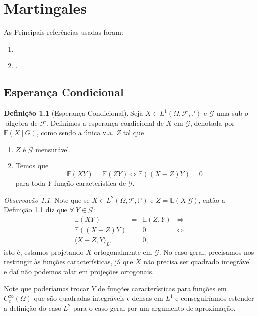 \documentclass[12pt,a4paper,oneside]{book}
\theoremstyle{definition}
\newtheorem{definition}[theorem]{Defini\c{c}\~ao}
\theoremstyle{remark}
\newtheorem{remark}[theorem]{Observa\c{c}\~ao}
\numberwithin{equation}{section}
\newcommand{\E}{\mathbb{E}}
\newcommand{\pr}{\mathbb{P}}
\begin{document}
\newpage








\chapter{Martingales}\label{cap-marting}

\begin{tcolorbox}[colback = white]
As Principais referências usadas foram:
\begin{enumerate}
\item \cite{durrett}
\item \cite{williams-martingales}.
\end{enumerate}
\end{tcolorbox}

\section{Esperança Condicional}



\begin{definition}[Esperança Condicional] \label{defi-espcond}Seja $X\in L^1(\Omega,\mathcal{F},\pr)$ e $\mathcal{G}$ uma sub $\sigma$-álgebra de $\mathcal{F}$. Definimos a esperança condicional de $X$ em $\mathcal{G}$, denotada por $\E(X\ |\ {G})$, como sendo a única v.a. $Z$ tal que
\begin{enumerate}
\item $Z$ é $\mathcal{G}$ mensurável.
\item Temos que
$$ \E(XY) = \E(ZY) \Leftrightarrow \E((X-Z)Y)=0$$
para toda $Y$ função característica de  $\mathcal{G}.$ 
\end{enumerate}
\end{definition}


\begin{tcolorbox}[colback = yellow!60]
\begin{remark}
Note que se $X\in L^2(\Omega,\mathcal{F},\pr)$ e $Z = \E(X|\mathcal{G}) $, então a Definição \ref{defi-espcond} diz que  $ \forall\ Y\in\mathcal{G}$:
$$
\begin{array}{lllcc}
\E(XY) &=& \E(Z,Y) &\Leftrightarrow \\
\E((X-Z)Y) &=& 0 &\Leftrightarrow\\
 \langle X-Z,Y \rangle_{L^2} &=& 0,
 \end{array}
$$
isto é, estamos projetando $X$ ortogonalmente em $\mathcal{G}$. No caso geral, precisamos nos restringir às funções características, já que $X$ não precisa ser quadrado integrável e daí não podemos falar em projeções ortogonais.

Note que poderíamos trocar $Y$ de funções características para funções em $C^\infty_c(\Omega)$ que são quadradas integráveis e densas em $L^1$ e conseguiríamos estender a definição do caso $L^2$ para o caso geral por um argumento de aproximação.
\end{remark}
\end{tcolorbox}
\end{document}
